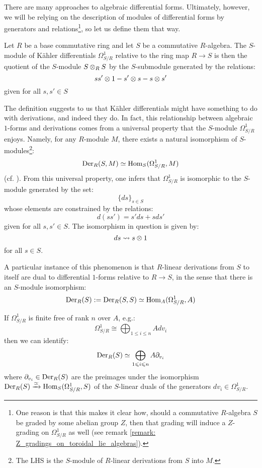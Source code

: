         There are many approaches to algebraic differential forms. Ultimately, however, we will be relying on the description of modules of differential forms by generators and relations\footnote{One reason is that this makes it clear how, should a commutative $R$-algebra $S$ be graded by some abelian group $Z$, then that grading will induce a $Z$-grading on $\Omega^1_{S/R}$ as well (see remark \ref{remark: Z_gradings_on_toroidal_lie_algebras}).}, so let us define them that way.
        \begin{definition} \label{def: kahler_differentials}
            Let $R$ be a base commutative ring and let $S$ be a commutative $R$-algebra. The $S$-module of K\"ahler differentials $\Omega^1_{S/R}$ relative to the ring map $R \to S$ is then the quotient of the $S$-module $S \tensor_R S$ by the $S$-submodule generated by the relations:
                $$ss' \tensor 1 - s' \tensor s - s \tensor s'$$
            given for all $s, s' \in S$
        \end{definition}
        \begin{remark} \label{remark: differentials_and_derivations}
            The definition suggests to us that K\"ahler differentials might have something to do with derivations, and indeed they do. In fact, this relationship between algebraic $1$-forms and derivations comes from a universal property that the $S$-module $\Omega^1_{S/R}$ enjoys. Namely, for any $R$-module $M$, there exists a natural isomorphism of $S$-modules\footnote{The LHS is the $S$-module of $R$-linear derivations from $S$ into $M$.}:
                $$\mathrm{Der}_R(S, M) \simeq \mathrm{Hom}_S(\Omega^1_{S/R}, M)$$
            (cf. \cite[\href{https://stacks.math.columbia.edu/tag/00RO}{Tag 00RO}]{stacks}). From this universal property, one infers that $\Omega^1_{S/R}$ is isomorphic to the $S$-module generated by the set:
                $$\{ds\}_{s \in S}$$
            whose elements are constrained by the relations:
                $$d(ss') = s' ds + s ds'$$
            given for all $s, s' \in S$. The isomorphism in question is given by:
                $$ds \mapsto s \tensor 1$$
            for all $s \in S$.
            
            A particular instance of this phenomenon is that $R$-linear derivations from $S$ to itself are dual to differential $1$-forms relative to $R \to S$, in the sense that there is an $S$-module isomorphism:
                $$\mathrm{Der}_R(S) := \mathrm{Der}_R(S, S) \simeq \mathrm{Hom}_A(\Omega^1_{S/R}, A)$$
        \end{remark}
        \begin{remark}
            If $\Omega^1_{S/R}$ is finite free of rank $n$ over $A$, e.g.:
                $$\Omega^1_{S/R} \cong \bigoplus_{1 \leq i \leq n} A dv_i$$
            then we can identify:
                $$\mathrm{Der}_R(S) \simeq \bigoplus_{1 \leqslant i \leqslant n} A \partial_{v_i}$$
            where $\partial_{v_i} \in \mathrm{Der}_R(S)$ are the preimages under the isomorphism $\mathrm{Der}_R(S) \xrightarrow[]{\simeq} \mathrm{Hom}_S(\Omega^1_{S/R}, S)$ of the $S$-linear duals of the generators $dv_i \in \Omega^1_{S/R}$. 
        \end{remark}
        
